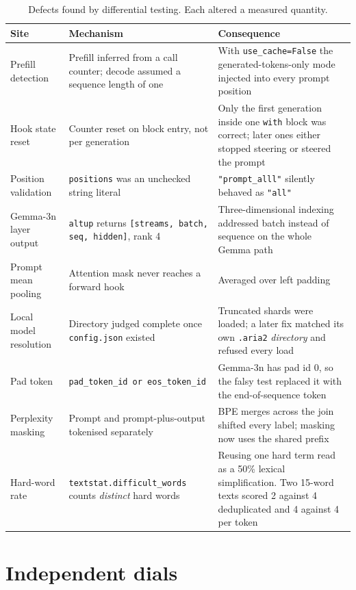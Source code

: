 \documentclass[twocolumn,10pt,a4paper]{article}
\newcommand{\code}[1]{\texttt{\small #1}}
\begin{document}
\begin{table}[t]
\centering
\small
\begin{tabular}{p{3.4cm}p{6.2cm}p{6.2cm}}
\toprule
Site & Mechanism & Consequence \\
\midrule
Prefill detection & Prefill inferred from a call counter; decode assumed a
sequence length of one & With \code{use\_cache=False} the generated-tokens-only
mode injected into every prompt position \\
Hook state reset & Counter reset on block entry, not per generation & Only the
first generation inside one \code{with} block was correct; later ones either
stopped steering or steered the prompt \\
Position validation & \code{positions} was an unchecked string literal &
\code{"prompt\_alll"} silently behaved as \code{"all"} \\
Gemma-3n layer output & \code{altup} returns
\code{[streams, batch, seq, hidden]}, rank 4 & Three-dimensional indexing
addressed batch instead of sequence on the whole Gemma path \\
Prompt mean pooling & Attention mask never reaches a forward hook & Averaged
over left padding \\
Local model resolution & Directory judged complete once \code{config.json}
existed & Truncated shards were loaded; a later fix matched its own
\code{.aria2} \emph{directory} and refused every load \\
Pad token & \code{pad\_token\_id or eos\_token\_id} & Gemma-3n has pad id 0, so
the falsy test replaced it with the end-of-sequence token \\
Perplexity masking & Prompt and prompt-plus-output tokenised separately & BPE
merges across the join shifted every label; masking now uses the shared prefix \\
Hard-word rate & \code{textstat.difficult\_words} counts \emph{distinct} hard
words & Reusing one hard term read as a 50\% lexical simplification. Two 15-word
texts scored 2 against 4 deduplicated and 4 against 4 per token \\
\bottomrule
\end{tabular}
\caption{Defects found by differential testing. Each altered a measured
quantity.}
\label{tab:defects}
\end{table}

\section{Independent dials}
\end{document}
